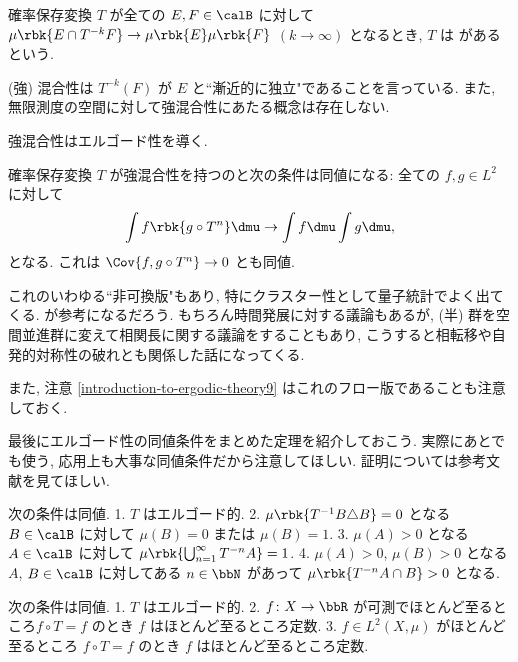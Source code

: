 \documentclass[openany, a4paper, oneside]{jsbook}
\begin{document}
\begin{defn}\label{introduction-to-ergodic-theory19}
確率保存変換 $T$ が全ての $E, F \in \calB$ に対して
$\mu \rbk{E \cap T^{-k}F} \to \mu \rbk{E} \mu \rbk{F}$ $(k \to \infty)$ となるとき,
$T$ は があるという.
\end{defn}
\begin{rem}
(強) 混合性は $T^{-k}(F)$ が $E$ と``漸近的に独立"であることを言っている.
また, 無限測度の空間に対して強混合性にあたる概念は存在しない.
\end{rem}
\begin{thm}
強混合性はエルゴード性を導く.
\end{thm}
\begin{thm}\label{introduction-to-ergodic-theory21}
確率保存変換 $T$ が強混合性を持つのと次の条件は同値になる:
全ての $f,g \in L^2$ に対して
\begin{align}
 \int f \rbk{g \circ T^{n}} \dmu
 \to
 \int f \dmu \int g \dmu,
\end{align}
となる.
これは $\Cov{f, g \circ T^n} \to 0$ とも同値.
\end{thm}
\begin{rem}\label{introduction-to-ergodic-theory18}
これのいわゆる``非可換版"もあり, 特にクラスター性として量子統計でよく出てくる.
\cite{BratteliRobinson1, BratteliRobinson2} が参考になるだろう.
もちろん時間発展に対する議論もあるが,
(半) 群を空間並進群に変えて相関長に関する議論をすることもあり,
こうすると相転移や自発的対称性の破れとも関係した話になってくる.

また, 注意 \ref{introduction-to-ergodic-theory9} はこれのフロー版であることも注意しておく.
\end{rem}

最後にエルゴード性の同値条件をまとめた定理を紹介しておこう.
実際にあとでも使う, 応用上も大事な同値条件だから注意してほしい.
証明については参考文献を見てほしい.
\begin{thm}
次の条件は同値.
1. $T$ はエルゴード的.
2. $\mu \rbk{T^{-1} B \triangle B} = 0$ となる $B \in \calB$ に対して $\mu (B) = 0$ または $\mu (B) = 1$.
3. $\mu (A) > 0$ となる $A \in \calB$ に対して $\mu \rbk{\bigcup_{n=1}^{\infty} T^{-n} A} = 1$.
4. $\mu (A) > 0$, $\mu (B) > 0$ となる $A$, $B \in \calB$ に対してある $n \in \bbN$ があって $\mu \rbk{T^{-n} A \cap B} > 0$ となる.
\end{thm}
\begin{thm}
次の条件は同値.
1. $T$ はエルゴード的.
2. $f \colon X \to \bbR$ が可測でほとんど至るところ$f \circ T = f$ のとき $f$ はほとんど至るところ定数.
3. $f \in L^2 (X, \mu)$ がほとんど至るところ $f \circ T = f$ のとき $f$ はほとんど至るところ定数.
\end{thm}
\end{document}
